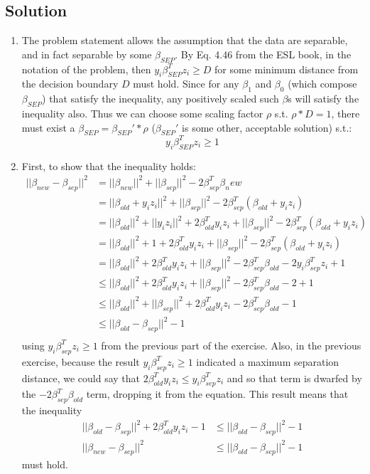 \documentclass{article}
\begin{document}
\subsection{Solution}
\begin{enumerate}
  \item The problem statement allows the assumption that the data are separable, and in fact separable by some $\beta_{SEP}$. By Eq. 4.46 from the ESL book, in the notation of the problem, then $ y_{i}\beta_{SEP}^{T}z_{i} \ge D $ for some minimum distance from the decision boundary $D$ must hold. Since for any $\beta_{1}$ and $\beta_{0}$ (which compose $\beta_{SEP}$) that satisfy the inequality, any positively scaled such $\beta$s will satisfy the inequality also. Thus we can choose some scaling factor $\rho$ s.t. $ \rho * D = 1$, there must exist a 
  $\beta_{SEP} = \beta_{SEP}\prime * \rho$ ($\beta_{SEP}\prime$ is some other, acceptable solution) s.t.:
  $$ y_{i}\beta_{SEP}^{T}z_{i} \ge 1 $$

  \item First, to show that the inequality holds:
  \begin{align*}
    ||\beta_{new} - \beta_{sep}||^{2} 
      &= ||\beta_{new}||^{2} + ||\beta_{sep}||^{2} - 2\beta_{sep}^{T}\beta_new \\
    &= ||\beta_{old} + y_{i}z_{i}||^{2} + ||\beta_{sep}||^{2} - 2\beta_{sep}^{T}(\beta_{old} + y_{i}z_{i}) \\
    &= ||\beta_{old}||^{2} + ||y_{i}z_{i}||^{2} + 2\beta_{old}^{T}y_{i}z_{i} + ||\beta_{sep}||^{2} - 2\beta_{sep}^{T}(\beta_{old} + y_{i}z_{i}) \\
    &= ||\beta_{old}||^{2} + 1 + 2\beta_{old}^{T}y_{i}z_{i} + ||\beta_{sep}||^{2} - 2\beta_{sep}^{T}(\beta_{old} + y_{i}z_{i}) \\
    &= ||\beta_{old}||^{2} + 2\beta_{old}^{T}y_{i}z_{i} + ||\beta_{sep}||^{2} - 2\beta_{sep}^{T}\beta_{old} - 2y_{i}\beta_{sep}^{T}z_{i} + 1\\
    &\le ||\beta_{old}||^{2} + 2\beta_{old}^{T}y_{i}z_{i} + ||\beta_{sep}||^{2} - 2\beta_{sep}^{T}\beta_{old} - 2 + 1\\
    &\le ||\beta_{old}||^{2} + ||\beta_{sep}||^{2} + 2\beta_{old}^{T}y_{i}z_{i} - 2\beta_{sep}^{T}\beta_{old} - 1 \\
    &\le ||\beta_{old} - \beta_{sep}||^{2} - 1 \\
  \end{align*}
  using $y_{i}\beta_{sep}^{T}z_{i} \ge 1$ from the previous part of the exercise. Also, in the previous exercise, because the result $y_{i}\beta_{sep}^{T}z_{i} \ge 1$ indicated a maximum separation distance, we could say that $2\beta_{old}^{T}y_{i}z_{i} \le y_{i}\beta_{sep}^{T}z_{i} $ and so that term is dwarfed by the 
  $-2\beta_{sep}^{T}\beta_{old}$ term, dropping it from the equation. This result means that the inequality
  \begin{align*}
  ||\beta_{old} - \beta_{sep}||^{2} + 2\beta_{old}^{T}y_{i}z_{i} - 1 &\le ||\beta_{old} - \beta_{sep}||^{2} - 1 \\
  ||\beta_{new} - \beta_{sep}||^{2} &\le ||\beta_{old} - \beta_{sep}||^{2} - 1
  \end{align*}
  must hold. \\


\end{enumerate}
\end{document}
